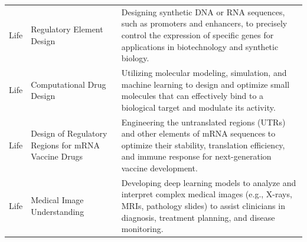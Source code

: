 \begin{longtable}{p{2cm}p{6cm}p{7cm}}
\rowcolor{LifeColor} Life & Regulatory Element Design & Designing synthetic DNA or RNA sequences, such as promoters and enhancers, to precisely control the expression of specific genes for applications in biotechnology and synthetic biology. \\
\rowcolor{LifeColor} Life & Computational Drug Design & Utilizing molecular modeling, simulation, and machine learning to design and optimize small molecules that can effectively bind to a biological target and modulate its activity. \\
\rowcolor{LifeColor} Life & Design of Regulatory Regions for mRNA Vaccine Drugs & Engineering the untranslated regions (UTRs) and other elements of mRNA sequences to optimize their stability, translation efficiency, and immune response for next-generation vaccine development. \\
\rowcolor{LifeColor} Life & Medical Image Understanding & Developing deep learning models to analyze and interpret complex medical images (e.g., X-rays, MRIs, pathology slides) to assist clinicians in diagnosis, treatment planning, and disease monitoring. \\


\end{longtable}
